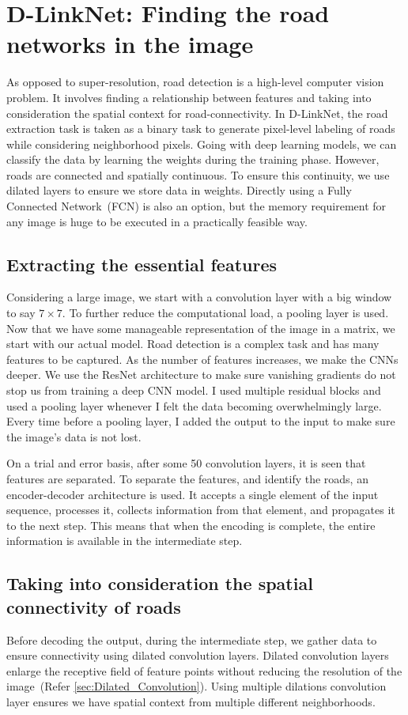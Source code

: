 \section{D-LinkNet: Finding the road networks in the image}
As opposed to super-resolution, road detection is a high-level computer vision problem. It involves finding a relationship between features and taking into consideration the spatial context for road-connectivity. In D-LinkNet, the road extraction task is taken as a binary task to generate pixel-level labeling of roads while considering neighborhood pixels. Going with deep learning models, we can classify the data by learning the weights during the training phase. However, roads are connected and spatially continuous. To ensure this continuity, we use dilated layers to ensure we store data in weights. Directly using a Fully Connected Network~(FCN) is also an option, but the memory requirement for any image is huge to be executed in a practically feasible way.

\subsection{Extracting the essential features}
Considering a large image, we start with a convolution layer with a big window to say $7\times7$. To further reduce the computational load, a pooling layer is used. Now that we have some manageable representation of the image in a matrix, we start with our actual model. Road detection is a complex task and has many features to be captured. As the number of features increases, we make the CNNs deeper. We use the ResNet architecture to make sure vanishing gradients do not stop us from training a deep CNN model. I used multiple residual blocks and used a pooling layer whenever I felt the data becoming overwhelmingly large. Every time before a pooling layer, I added the output to the input to make sure the image's data is not lost.

On a trial and error basis, after some 50 convolution layers, it is seen that features are separated. To separate the features, and identify the roads, an encoder-decoder architecture is used. It accepts a single element of the input sequence, processes it, collects information from that element, and propagates it to the next step. This means that when the encoding is complete, the entire information is available in the intermediate step.

\subsection{Taking into consideration the spatial connectivity of roads}
Before decoding the output, during the intermediate step, we gather data to ensure connectivity using dilated convolution layers. Dilated convolution layers enlarge the receptive field of feature points without reducing the resolution of the image~(Refer \cref{sec:Dilated_Convolution}). Using multiple dilations convolution layer ensures we have spatial context from multiple different neighborhoods.

